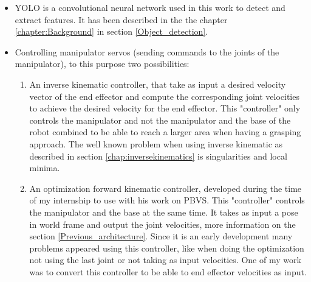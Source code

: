 \begin{itemize}
    \item 
\gls{YOLO} is a convolutional neural network used in this work to detect and extract features. It has been described in the the chapter \ref{chapter:Background} in section \ref{Object_detection}.
    \item 
Controlling manipulator servos (sending commands to the joints of the manipulator), to this purpose two possibilities:
    \begin{enumerate}
        \item  An inverse kinematic controller, that take as input a desired velocity vector of the end effector and compute the corresponding joint velocities to achieve the desired velocity for the end effector. This "controller" only controls the manipulator and not the manipulator and the base of the robot combined to be able to reach a larger area when having a grasping approach. The well known problem when using inverse kinematic as described in section \ref{chap:inversekinematics} is singularities and local minima.
        \item An optimization forward kinematic controller, developed during the time of my internship to use with his work on \gls{PBVS}. This "controller" controls the manipulator and the base at the same time. It takes as input a pose in world frame and output the joint velocities, more information on the section \ref{Previous_architecture}. Since it is an early development many problems appeared using this controller, like when doing the optimization not using the last joint or not taking as input velocities. One of my work was to convert this controller to be able to end effector velocities as input.
    \end{enumerate}

\end{itemize}

